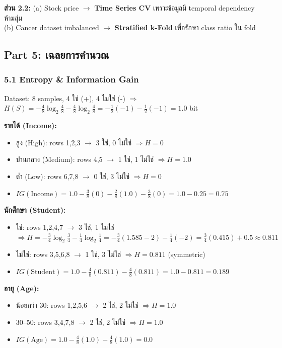 \documentclass[a4paper,12pt]{article}
\begin{document}
\textbf{ส่วน 2.2:} (a) Stock price $\rightarrow$ \textbf{Time Series CV} เพราะข้อมูลมี temporal dependency ห้ามสุ่ม\\
(b) Cancer dataset imbalanced $\rightarrow$ \textbf{Stratified k-Fold} เพื่อรักษา class ratio ใน fold

\newpage
\subsection*{Part 5: เฉลยการคำนวณ}

\subsubsection*{5.1 Entropy \& Information Gain}

Dataset: 8 samples, 4 ใช่ (+), 4 ไม่ใช่ (-) $\Rightarrow$ $H(S) = -\frac{4}{8}\log_2\frac{4}{8} - \frac{4}{8}\log_2\frac{4}{8} = -\frac{1}{2}(-1) - \frac{1}{2}(-1) = \mathbf{1.0}$ bit

\textbf{รายได้ (Income):}
\begin{itemize}
    \item สูง (High): rows 1,2,3 $\to$ 3 ใช่, 0 ไม่ใช่ $\Rightarrow H = 0$
    \item ปานกลาง (Medium): rows 4,5 $\to$ 1 ใช่, 1 ไม่ใช่ $\Rightarrow H = 1.0$
    \item ต่ำ (Low): rows 6,7,8 $\to$ 0 ใช่, 3 ไม่ใช่ $\Rightarrow H = 0$
    \item $IG(\text{Income}) = 1.0 - \frac{3}{8}(0) - \frac{2}{8}(1.0) - \frac{3}{8}(0) = 1.0 - 0.25 = \mathbf{0.75}$
\end{itemize}

\textbf{นักศึกษา (Student):}
\begin{itemize}
    \item ใช่: rows 1,2,4,7 $\to$ 3 ใช่, 1 ไม่ใช่ $\Rightarrow H = -\frac{3}{4}\log_2\frac{3}{4} - \frac{1}{4}\log_2\frac{1}{4} = -\frac{3}{4}(1.585-2) - \frac{1}{4}(-2) = \frac{3}{4}(0.415) + 0.5 \approx 0.811$
    \item ไม่ใช่: rows 3,5,6,8 $\to$ 1 ใช่, 3 ไม่ใช่ $\Rightarrow H = 0.811$ (symmetric)
    \item $IG(\text{Student}) = 1.0 - \frac{4}{8}(0.811) - \frac{4}{8}(0.811) = 1.0 - 0.811 = \mathbf{0.189}$
\end{itemize}

\textbf{อายุ (Age):}
\begin{itemize}
    \item น้อยกว่า 30: rows 1,2,5,6 $\to$ 2 ใช่, 2 ไม่ใช่ $\Rightarrow H = 1.0$
    \item 30--50: rows 3,4,7,8 $\to$ 2 ใช่, 2 ไม่ใช่ $\Rightarrow H = 1.0$
    \item $IG(\text{Age}) = 1.0 - \frac{4}{8}(1.0) - \frac{4}{8}(1.0) = \mathbf{0.0}$
\end{itemize}
\end{document}

